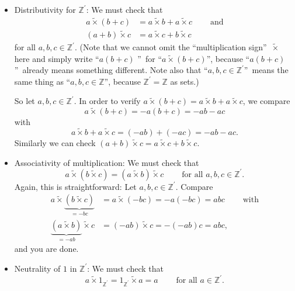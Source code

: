 \documentclass[numbers=enddot,12pt,final,onecolumn,notitlepage]{scrartcl}%
\numberwithin{exer}{subsection}
\theoremstyle{definition}
\begin{document}
\begin{itemize}
\begin{itemize}
\item Distributivity for $\mathbb{Z}^{\prime}$: We must check that%
\begin{align*}
a\widetilde{\times}\left(  b+c\right)    & =a\widetilde{\times}%
b+a\widetilde{\times}c\ \ \ \ \ \ \ \ \ \ \text{and}\\
\left(  a+b\right)  \widetilde{\times}c  & =a\widetilde{\times}%
c+b\widetilde{\times}c
\end{align*}
for all $a,b,c\in\mathbb{Z}^{\prime}$. (Note that we cannot omit the
\textquotedblleft multiplication sign\textquotedblright\ $\widetilde{\times}$
here and simply write \textquotedblleft$a\left(  b+c\right)  $%
\textquotedblright\ for \textquotedblleft$a\widetilde{\times}\left(
b+c\right)  $\textquotedblright, because \textquotedblleft$a\left(
b+c\right)  $\textquotedblright\ already means something different. Note also
that \textquotedblleft$a,b,c\in\mathbb{Z}^{\prime}$\textquotedblright\ means
the same thing as \textquotedblleft$a,b,c\in\mathbb{Z}$\textquotedblright,
because $\mathbb{Z}^{\prime}=\mathbb{Z}$ as sets.)

So let $a,b,c\in\mathbb{Z}^{\prime}$. In order to verify $a\widetilde{\times
}\left(  b+c\right)  =a\widetilde{\times}b+a\widetilde{\times}c$, we compare%
\[
a\widetilde{\times}\left(  b+c\right)  =-a\left(  b+c\right)  =-ab-ac
\]
with%
\[
a\widetilde{\times}b+a\widetilde{\times}c=\left(  -ab\right)  +\left(
-ac\right)  =-ab-ac.
\]
Similarly we can check $\left(  a+b\right)  \widetilde{\times}%
c=a\widetilde{\times}c+b\widetilde{\times}c$.

\item Associativity of multiplication: We must check that%
\[
a\widetilde{\times}\left(  b\widetilde{\times}c\right)  =\left(
a\widetilde{\times}b\right)  \widetilde{\times}c\ \ \ \ \ \ \ \ \ \ \text{for
all }a,b,c\in\mathbb{Z}^{\prime}.
\]
Again, this is straightforward: Let $a,b,c\in\mathbb{Z}^{\prime}$. Compare%
\begin{align*}
a\widetilde{\times}\underbrace{\left(  b\widetilde{\times}c\right)  }_{=-bc}
& =a\widetilde{\times}\left(  -bc\right)  =-a\left(  -bc\right)
=abc\ \ \ \ \ \ \ \ \ \ \text{with}\\
\underbrace{\left(  a\widetilde{\times}b\right)  }_{=-ab}\widetilde{\times}c
& =\left(  -ab\right)  \widetilde{\times}c=-\left(  -ab\right)  c=abc,
\end{align*}
and you are done.

\item Neutrality of $1$ in $\mathbb{Z}^{\prime}$: We must check that%
\[
a\widetilde{\times}1_{\mathbb{Z}^{\prime}}=1_{\mathbb{Z}^{\prime}%
}\widetilde{\times}a=a\ \ \ \ \ \ \ \ \ \ \text{for all }a\in\mathbb{Z}%
^{\prime}.
\]



\end{itemize}
\end{itemize}
\end{document}
